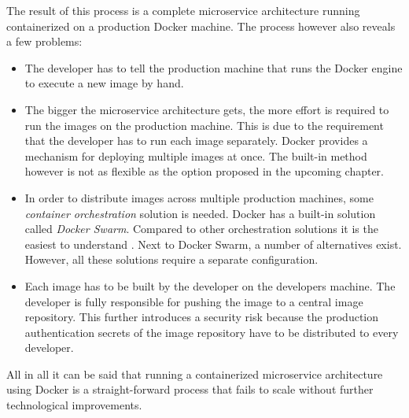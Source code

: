The result of this process is a complete microservice architecture running
containerized on a production Docker machine. The process however also reveals
a few problems:
\begin{itemize}
  \item The developer has to tell the production machine that runs the Docker
    engine to execute a new image by hand.
  \item The bigger the microservice architecture gets, the more effort is
    required to run the images on the production machine. This is due to the
    requirement that the developer has to run each image separately. Docker
    provides a mechanism for deploying multiple images at once. The built-in
    method however is not as flexible as the option proposed in the upcoming
    chapter.
  \item In order to distribute images across multiple production machines, some
    \textit{container orchestration} solution is needed. Docker has a built-in
    solution called \textit{Docker Swarm}. Compared to other orchestration
    solutions it is the easiest to understand \autocite[p.
    17]{FabrizioSoppelsaNativeDockerClustering2016}. Next to Docker Swarm, a
    number of alternatives exist. However, all these solutions require a
    separate configuration.
  \item Each image has to be built by the developer on the developers machine.
    The developer is fully responsible for pushing the image to a central image
    repository. This further introduces a security risk because the production
    authentication secrets of the image repository have to be distributed to
    every developer.
\end{itemize}

All in all it can be said that running a containerized microservice
architecture using Docker is a straight-forward process that fails to scale
without further technological improvements.
